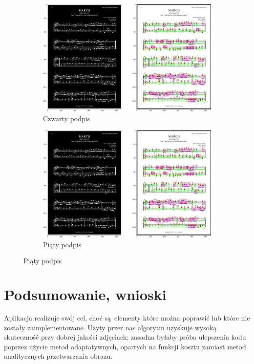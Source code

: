 \documentclass[12pt]{article}
\begin{document}
\begin{figure}[h!]
	\begin{subfigure}[b]{0.48\linewidth}
		\includegraphics[width=\linewidth]{Zdj0.png}
		\caption{Czwarty podpis}
	\end{subfigure}
	\begin{subfigure}[b]{0.48\linewidth}
		\includegraphics[width=\linewidth]{Zdj0.png}
		\caption{Piąty podpis}
	\end{subfigure}
\end{figure}

\section{Podsumowanie, wnioski}
Aplikacja realizuje swój cel, choć są elementy które można poprawić lub które nie zostały zaimplementowane. Użyty przez nas algorytm uzyskuje wysoką skuteczność przy dobrej jakości zdjęciach; zasadna byłaby próba ulepszenia kodu poprzez użycie metod adaptatywnych, opartych na funkcji kosztu zamiast metod analitycznych przetwarzania obrazu.
\end{document}

